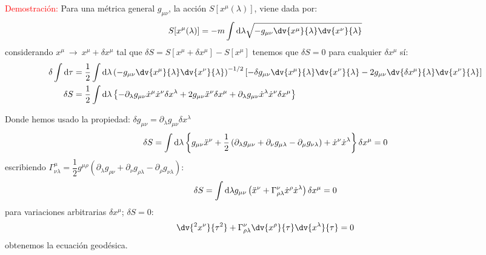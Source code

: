 \documentclass[../main]{subfiles}
\begin{document}
\begin{adjustwidth}{0pt}{-100pt}
\textcolor{red}{Demostración:} Para una métrica general $g_{\mu\nu}$, la acción $S[x^{\mu}(\lambda)]$, viene dada por:
\begin{equation}
    S[x^{\mu}(\lambda)]=-m\int \mathrm{d}\lambda \sqrt{-g_{\mu\nu}\dv{x^{\mu}}{\lambda}\dv{x^{\nu}}{\lambda}}
\end{equation}
considerando $x^{\mu} \ \rightarrow \ x^{\mu}+\delta x^{\mu}$ tal que $\delta S=S[x^{\mu}+\delta x^{\mu}]-S[x^{\mu}]$ tenemos que $\delta S=0$ para cualquier $\delta x^{\mu}$ sí:
\begin{equation}
    \begin{aligned}
        \delta \int \mathrm{d}\tau&=\dfrac{1}{2}\int \mathrm{d}\lambda \left(-g_{\mu\nu}\dv{x^{\mu}}{\lambda}\dv{x^{\nu}}{\lambda}\right)^{-1/2} \left[-\delta g_{\mu\nu} \dv{x^{\mu}}{\lambda}\dv{x^{\nu}}{\lambda}-2g_{\mu\nu}\dv{\delta x^{\mu}}{\lambda}\dv{x^{\nu}}{\lambda}\right]\\
        \delta S&=\dfrac{1}{2}\int \mathrm{d} \lambda \left\{-\partial_{\lambda}g_{\mu\nu}\dot{x}^{\mu}\dot{x}^{\nu}\delta x^{\lambda}+2g_{\mu\nu}\ddot{x}^{\nu}\delta x^{\mu}+\partial_{\lambda}g_{\mu\nu}\dot{x}^{\lambda}\dot{x}^{\nu}\delta x^{\mu} \right\}
    \end{aligned}
\end{equation}

Donde hemos usado la propiedad: $\delta g_{\mu\nu}=\partial_{\lambda}g_{\mu\nu}\delta x^{\lambda}$
\begin{equation}
    \delta S=\int \mathrm{d}\lambda \left\{g_{\mu\nu}\ddot{x}^{\nu}+\dfrac{1}{2}\left(\partial_{\lambda}g_{\mu\nu}+\partial_{\nu}g_{\mu\lambda}-\partial_{\mu}g_{\nu\lambda}\right)+\dot{x}^{\nu}\dot{x}^{\lambda} \right\}\delta x^{\mu}=0\\
\end{equation}
escribiendo $\Gamma^{\mu}_{\nu\lambda}=\dfrac{1}{2}g^{\mu\rho}\left(\partial_{\lambda}g_{\rho\nu}+\partial_{\nu}g_{\rho\lambda}-\partial_{\rho}g_{\nu\lambda}\right)$:
\begin{equation}
    \delta S=\int \mathrm{d}\lambda g_{\mu\nu}\left(\ddot{x}^{\nu}+\Gamma^{\nu}_{\rho\lambda}\dot{x}^{\rho}\dot{x}^{\lambda}\right)\delta x^{\mu}=0\\
\end{equation}
para variaciones arbitrarias $\delta x^{\mu}$; $\delta S=0$:
\begin{equation}
    \dv{^2 x^{\nu}}{\tau^2}+\Gamma^{\nu}_{\rho\lambda}\dv{x^{\rho}}{\tau}\dv{x^{\lambda}}{\tau}=0
\end{equation}
obtenemos la ecuación geodésica.


\end{adjustwidth}
\end{document}
